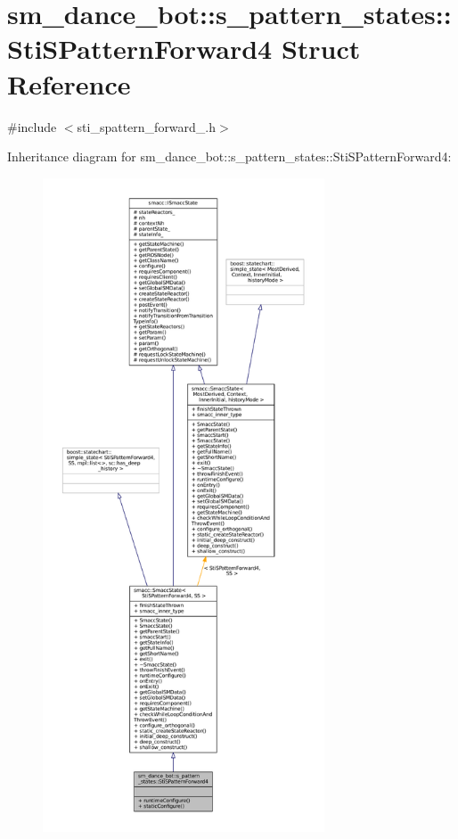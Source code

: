 \hypertarget{structsm__dance__bot_1_1s__pattern__states_1_1StiSPatternForward4}{}\section{sm\+\_\+dance\+\_\+bot\+:\+:s\+\_\+pattern\+\_\+states\+:\+:Sti\+S\+Pattern\+Forward4 Struct Reference}
\label{structsm__dance__bot_1_1s__pattern__states_1_1StiSPatternForward4}


{\ttfamily \#include $<$sti\+\_\+spattern\+\_\+forward\+\_.\+h$>$}



Inheritance diagram for sm\+\_\+dance\+\_\+bot\+:\+:s\+\_\+pattern\+\_\+states\+:\+:Sti\+S\+Pattern\+Forward4\+:
\nopagebreak
\begin{figure}[H]
\begin{center}
\leavevmode
\includegraphics[height=550pt]{structsm__dance__bot_1_1s__pattern__states_1_1StiSPatternForward4__inherit__graph}
\end{center}
\end{figure}


